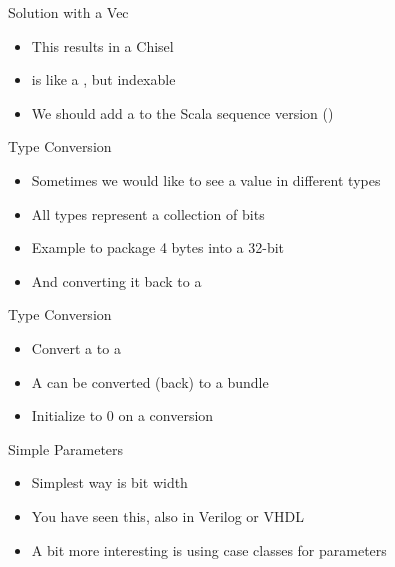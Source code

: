 \begin{frame}[fragile]{Solution with a Vec}
\begin{itemize}
\item This results in a Chisel 
\item {} is like a , but indexable
\item We should add a  to the Scala sequence version ()
\end{itemize}
\end{frame}


\begin{frame}[fragile]{Type Conversion}
\begin{itemize}
\item Sometimes we would like to see a value in different types
\item All types represent a collection of bits
\item Example to package 4 bytes into a 32-bit 
\item And converting it back to a 
\end{itemize}
\end{frame}

\begin{frame}[fragile]{Type Conversion}
\begin{itemize}
\item Convert a  to a 
\item A  can be converted (back) to a bundle
\item Initialize to 0 on a conversion
\end{itemize}
\end{frame}


\begin{frame}[fragile]{Simple Parameters}
\begin{itemize}
\item Simplest way is bit width
\item You have seen this, also in Verilog or VHDL
\item A bit more interesting is using case classes for parameters
\end{itemize}
\end{frame}



